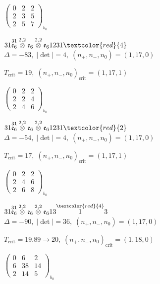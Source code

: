 \documentclass[10pt]{article}
\begin{document}
\hspace{2em}$\left(\begin{smallmatrix}0 & 2 & 2 \\ 2 & 3 & 5 \\ 2 & 5 & 7\end{smallmatrix}\right)_{\!b_0}$

$31\overset{31}{\mathfrak{e}_6}\overset{2,2}{\otimes}\mathfrak{e}_6\overset{2,2}{\otimes}\mathfrak{e}_61231\textcolor{red}{4}$ \quad $\Delta=-83,\; |\det|=4,\; (n_+,n_-,n_0)=(1,17,0)$

\hspace{1em}$T_{\text{crit}}=19,\; (n_+,n_-,n_0)_{\text{crit}}=(1,17,1)$

\hspace{2em}$\left(\begin{smallmatrix}0 & 2 & 2 \\ 2 & 2 & 4 \\ 2 & 4 & 6\end{smallmatrix}\right)_{\!b_0}$

$31\overset{31}{\mathfrak{e}_6}\overset{2,2}{\otimes}\mathfrak{e}_6\overset{2,2}{\otimes}\mathfrak{e}_61231\textcolor{red}{2}$ \quad $\Delta=-54,\; |\det|=4,\; (n_+,n_-,n_0)=(1,17,0)$

\hspace{1em}$T_{\text{crit}}=17,\; (n_+,n_-,n_0)_{\text{crit}}=(1,17,1)$

\hspace{2em}$\left(\begin{smallmatrix}0 & 2 & 2 \\ 2 & 4 & 6 \\ 2 & 6 & 8\end{smallmatrix}\right)_{\!b_0}$

\smallskip

$31\overset{31}{\mathfrak{e}_6}\overset{2,2}{\otimes}\mathfrak{e}_6\overset{2,2}{\otimes}\mathfrak{e}_613\overset{\textcolor{red}{4}}{1}3$ \quad $\Delta=-90,\; |\det|=36,\; (n_+,n_-,n_0)=(1,17,0)$

\hspace{1em}$T_{\text{crit}}=19.89 \to 20,\; (n_+,n_-,n_0)_{\text{crit}}=(1,18,0)$

\hspace{2em}$\left(\begin{smallmatrix}0 & 6 & 2 \\ 6 & 38 & 14 \\ 2 & 14 & 5\end{smallmatrix}\right)_{\!b_0}$
\end{document}

